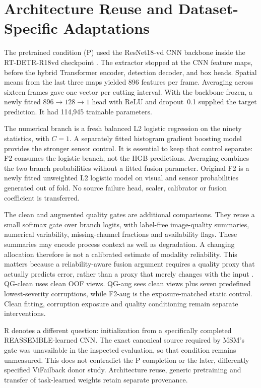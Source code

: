 \section{Architecture Reuse and Dataset-Specific Adaptations}
The pretrained condition (P) used the ResNet18-vd CNN backbone inside the RT-DETR-R18vd checkpoint \citep{Zhao2024RTDETR}. The extractor stopped at the CNN feature maps, before the hybrid Transformer encoder, detection decoder, and box heads. Spatial means from the last three maps yielded 896 features per frame. Averaging across sixteen frames gave one vector per cutting interval. With the backbone frozen, a newly fitted $896\rightarrow128\rightarrow1$ head with ReLU and dropout~0.1 supplied the target prediction. It had 114,945 trainable parameters.

The numerical branch is a fresh balanced L2 logistic regression on the ninety statistics, with $C=1$. A separately fitted histogram gradient boosting model provides the stronger sensor control. It is essential to keep that control separate: F2 consumes the logistic branch, not the HGB predictions. Averaging combines the two branch probabilities without a fitted fusion parameter. Original F2 is a newly fitted unweighted L2 logistic model on visual and sensor probabilities generated out of fold. No source failure head, scaler, calibrator or fusion coefficient is transferred.

The clean and augmented quality gates are additional comparisons. They reuse a small softmax gate over branch logits, with label-free image-quality summaries, numerical variability, missing-channel fractions and availability flags. These summaries may encode process context as well as degradation. A changing allocation therefore is not a calibrated estimate of modality reliability. This matters because a reliability-aware fusion argument requires a quality proxy that actually predicts error, rather than a proxy that merely changes with the input \citep{Zhang2023QMF}. QG-clean uses clean OOF views. QG-aug sees clean views plus seven predefined lowest-severity corruptions, while F2-aug is the exposure-matched static control. Clean fitting, corruption exposure and quality conditioning remain separate interventions.

R denotes a different question: initialization from a specifically completed REASSEMBLE-learned CNN. The exact canonical source required by MSM's gate was unavailable in the inspected evaluation, so that condition remains unmeasured. This does not contradict the P completion or the later, differently specified ViFailback donor study. Architecture reuse, generic pretraining and transfer of task-learned weights retain separate provenance.

